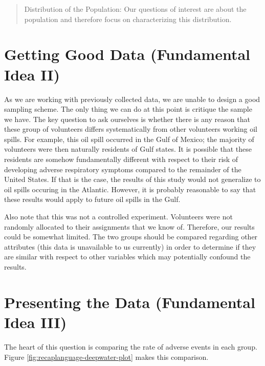 \documentclass[]{book}
\theoremstyle{definition}
\theoremstyle{definition}
\theoremstyle{definition}
\theoremstyle{remark}
\begin{document}
\begin{quote}
Distribution of the Population: Our questions of interest are about the
population and therefore focus on characterizing this distribution.
\end{quote}

\section{Getting Good Data (Fundamental Idea
II)}\label{getting-good-data-fundamental-idea-ii}

As we are working with previously collected data, we are unable to
design a good sampling scheme. The only thing we can do at this point is
critique the sample we have. The key question to ask ourselves is
whether there is any reason that these group of volunteers differs
systematically from other volunteers working oil spills. For example,
this oil spill occurred in the Gulf of Mexico; the majority of
volunteers were then naturally residents of Gulf states. It is possible
that these residents are somehow fundamentally different with respect to
their risk of developing adverse respiratory symptoms compared to the
remainder of the United States. If that is the case, the results of this
study would not generalize to oil spills occuring in the Atlantic.
However, it is probably reasonable to say that these results would apply
to future oil spills in the Gulf.

Also note that this was not a controlled experiment. Volunteers were not
randomly allocated to their assignments that we know of. Therefore, our
results could be somewhat limited. The two groups should be compared
regarding other attributes (this data is unavailable to us currently) in
order to determine if they are similar with respect to other variables
which may potentially confound the results.

\section{Presenting the Data (Fundamental Idea
III)}\label{presenting-the-data-fundamental-idea-iii}

The heart of this question is comparing the rate of adverse events in
each group. Figure \ref{fig:recaplanguage-deepwater-plot} makes this
comparison.
\end{document}
